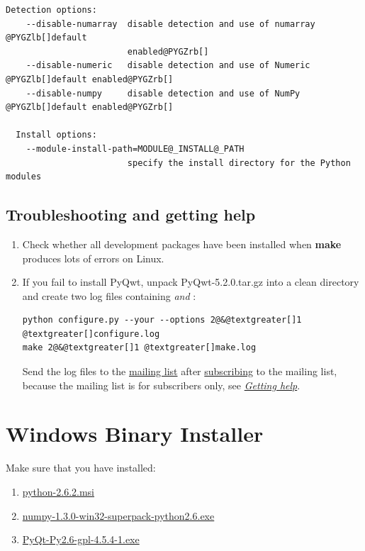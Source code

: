 \documentclass[a4paper,10pt,english]{manual}
\begin{document}
\begin{enumerate}
\begin{Verbatim}[commandchars=@\[\]]
  Detection options:
    --disable-numarray  disable detection and use of numarray @PYGZlb[]default
                        enabled@PYGZrb[]
    --disable-numeric   disable detection and use of Numeric @PYGZlb[]default enabled@PYGZrb[]
    --disable-numpy     disable detection and use of NumPy @PYGZlb[]default enabled@PYGZrb[]

  Install options:
    --module-install-path=MODULE@_INSTALL@_PATH
                        specify the install directory for the Python modules
\end{Verbatim}

\end{enumerate}


\subsection{Troubleshooting and getting help}
\begin{enumerate}
\item {} 
Check whether all development packages have been installed when
\textbf{make} produces lots of errors on Linux.

\item {} 
If you fail to install PyQwt, unpack PyQwt-5.2.0.tar.gz into a
clean directory and create two log files containing 
\emph{and} :

\begin{Verbatim}[commandchars=@\[\]]
python configure.py --your --options 2@&@textgreater[]1 @textgreater[]configure.log
make 2@&@textgreater[]1 @textgreater[]make.log
\end{Verbatim}

Send the log files to the
\href{mailto:pyqwt-users@lists.sourceforge.net}{mailing list} after
\href{http://lists.sourceforge.net/lists/listinfo/pyqwt-users}{subscribing}  to the
mailing list, because the mailing list is for subscribers only, see
\hyperlink{getting-help}{\emph{Getting help}}.

\end{enumerate}


\section{Windows Binary Installer}

Make sure that you have installed:
\begin{enumerate}
\item {} 
\href{http://www.python.org/ftp/python/2.6.2/python-2.6.2.msi}{python-2.6.2.msi}

\item {} 
\href{http://prdownloads.sourceforge.net/numpy/numpy-1.3.0-win32-superpack-python2.6.exe}{numpy-1.3.0-win32-superpack-python2.6.exe}

\item {} 
\href{http://pyqwt.sourceforge.net/support/PyQt-Py2.6-gpl-4.5.4-1.exe}{PyQt-Py2.6-gpl-4.5.4-1.exe}

\end{enumerate}
\end{document}
